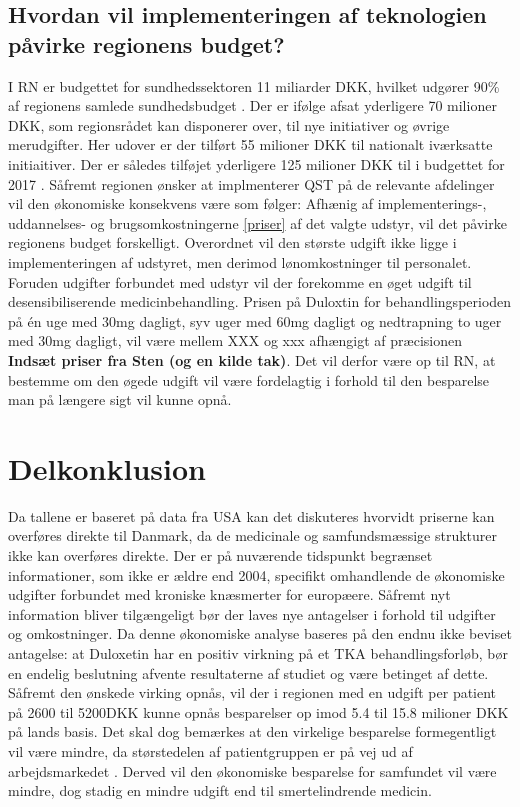 \subsection{Hvordan vil implementeringen af teknologien påvirke regionens budget?}
I RN er budgettet for sundhedssektoren 11 miliarder DKK, hvilket udgører 90\% af regionens samlede sundhedsbudget \citep{RnBudget17}. Der er ifølge  afsat yderligere 70 milioner DKK, som regionsrådet kan disponerer over, til nye initiativer og øvrige merudgifter. Her udover er der tilført 55 milioner DKK til nationalt iværksatte initiaitiver. Der er således tilføjet yderligere 125 milioner DKK til i budgettet for 2017 \citep{RnBudget17}.
Såfremt regionen ønsker at implmenterer QST på de relevante afdelinger vil den økonomiske konsekvens være som følger: Afhænig af implementerings-, uddannelses- og brugsomkostningerne \ref{priser} af det valgte udstyr, vil det påvirke regionens budget forskelligt. Overordnet vil den største udgift ikke ligge i implementeringen af udstyret, men derimod lønomkostninger til personalet. Foruden udgifter forbundet med udstyr vil der forekomme en øget udgift til desensibiliserende medicinbehandling. Prisen på Duloxtin for behandlingsperioden på én uge med 30mg dagligt, syv uger med 60mg dagligt og nedtrapning to uger med 30mg dagligt, vil være mellem XXX og xxx afhængigt af præcisionen \textbf{Indsæt priser fra Sten (og en kilde tak)}. Det vil derfor være op til RN, at bestemme om den øgede udgift vil være fordelagtig i forhold til den besparelse man på længere sigt vil kunne opnå.


\section{Delkonklusion}
Da tallene er baseret på data fra USA kan det diskuteres hvorvidt priserne kan overføres direkte til Danmark, da de medicinale og samfundsmæssige strukturer ikke kan overføres direkte. Der er på nuværende tidspunkt begrænset informationer, som ikke er ældre end 2004, specifikt omhandlende de økonomiske udgifter forbundet med kroniske knæsmerter for europæere. Såfremt nyt information bliver tilgængeligt bør der laves nye antagelser i forhold til udgifter og omkostninger. 
Da denne økonomiske analyse baseres på den endnu ikke beviset antagelse: at Duloxetin har en positiv virkning på et TKA behandlingsforløb, bør en endelig beslutning afvente resultaterne af studiet og være betinget af dette. Såfremt den ønskede virking opnås, vil der i regionen med en udgift per patient på 2600 til 5200DKK kunne opnås besparelser op imod 5.4 til 15.8 milioner DKK på lands basis. Det skal dog bemærkes at den virkelige besparelse formegentligt vil være mindre, da størstedelen af patientgruppen er på vej ud af arbejdsmarkedet \citep{Holmberg2015}. Derved vil den økonomiske besparelse for samfundet vil være mindre, dog stadig en mindre udgift end til smertelindrende medicin. 